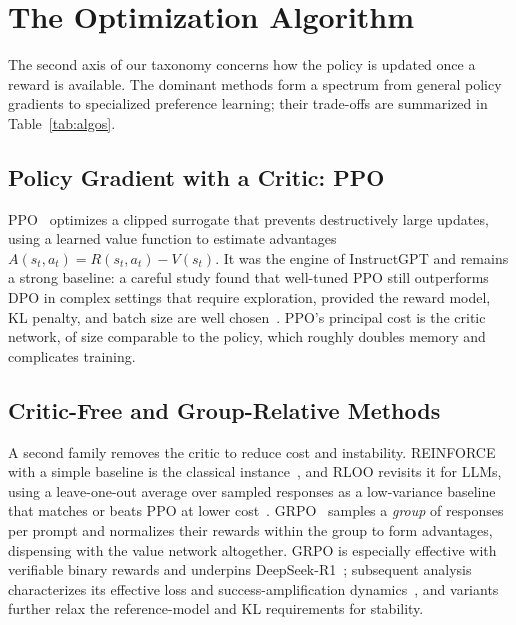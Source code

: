 \section{The Optimization Algorithm}\label{sec:optimization}

The second axis of our taxonomy concerns how the policy is updated once a
reward is available. The dominant methods form a spectrum from general
policy gradients to specialized preference learning; their trade-offs are
summarized in Table~\ref{tab:algos}.

\subsection{Policy Gradient with a Critic: PPO}

PPO~\cite{schulman2017ppo} optimizes a clipped surrogate that prevents
destructively large updates, using a learned value function to estimate
advantages $A(s_t,a_t)=R(s_t,a_t)-V(s_t)$. It was the engine of
InstructGPT and remains a strong baseline: a careful study found that
well-tuned PPO still outperforms DPO in complex settings that require
exploration, provided the reward model, KL penalty, and batch size are
well chosen~\cite{xu2024dpoppo}. PPO's principal cost is the critic
network, of size comparable to the policy, which roughly doubles memory
and complicates training.

\subsection{Critic-Free and Group-Relative Methods}

A second family removes the critic to reduce cost and instability.
REINFORCE with a simple baseline is the classical
instance~\cite{williams1992reinforce}, and RLOO revisits it for LLMs,
using a leave-one-out average over sampled responses as a low-variance
baseline that matches or beats PPO at lower
cost~\cite{ahmadian2024rloo}. GRPO~\cite{shao2024deepseekmath} samples a
\emph{group} of responses per prompt and normalizes their rewards within
the group to form advantages, dispensing with the value network
altogether. GRPO is especially effective with verifiable binary rewards
and underpins DeepSeek-R1~\cite{guo2025deepseekr1}; subsequent analysis
characterizes its effective loss and success-amplification
dynamics~\cite{shao2025grpodynamics}, and variants further relax the
reference-model and KL requirements for stability.

